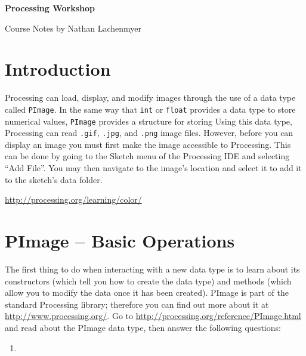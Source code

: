 \documentclass[11pt]{article}
\begin{document}
\centerline{\Large \bf Processing Workshop}
\medskip
\centerline{Course Notes by Nathan Lachenmyer}
\bigskip

\section{Introduction}
Processing can load, display, and modify images through the use of a data type called {\tt PImage}.  In the same way that {\tt int} or {\tt float} provides a data type to store numerical values, {\tt PImage} provides a structure for storing Using this data type, Processing can read {\tt .gif}, {\tt .jpg}, and {\tt .png} image files.  However, before you can display an image you must first make the image accessible to Processing.  This can be done by going to the Sketch menu of the Processing IDE and selecting ``Add File''.  You may then navigate to the image's location and select it to add it to the sketch's data folder.


\url{http://processing.org/learning/color/}

\section{PImage -- Basic Operations}
The first thing to do when interacting with a new data type is to learn about its constructors (which tell you how to create the data type) and methods (which allow you to modify the data once it has been created).  PImage is part of the standard Processing library; therefore you can find out more about it at \url{http://www.processing.org/}.  Go to \url{http://processing.org/reference/PImage.html} and read about the PImage data type, then answer the following questions:

\begin{enumerate}
\item 
\end{enumerate}
\end{document}

